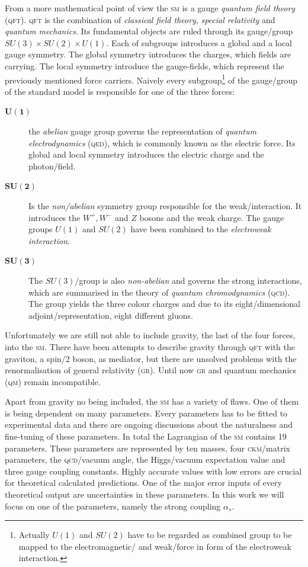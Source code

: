 \documentclass[../../index.tex]{subfiles}
\begin{document}
From a more mathematical point of view the \textsc{sm} is a gauge \textit{
  quantum field theory} (\textsc{qft}). \textsc{qft} is the combination of
\textit{classical field theory}, \textit{special relativity} and \textit{quantum
  mechanics}. Its fundamental objects are ruled through its gauge\-/group
$SU(3)\times SU(2)\times U(1)$. Each of subgroups introduces a global and a
local gauge symmetry. The global symmetry introduces the charges, which fields
are carrying. The local symmetry introduce the gauge-fields, which represent the
previously mentioned force carriers. Naively every subgroup\footnote{Actually
  $U(1)$ and $SU(2)$ have to be regarded as combined group to be mapped to the
  electromagnetic\-/ and weak\-/force in form of the electroweak interaction.}
of the gauge\-/group of the standard model is responsible for one of the three
forces:
\begin{description}
\item[$\bm{U(1)}$] the \textit{abelian} gauge group governs the representation
  of \textit{quantum electrodynamics} (\textsc{qed}), which is commonly known as
  the electric force. Its global and local symmetry introduces the electric
  charge and the photon\-/field.
\item[$\bm{SU(2)}$] Is the \textit{non\-/abelian} symmetry group responsible for
  the weak\-/interaction. It introduces the $W^+,W^-$ and $Z$ bosons and the
  weak charge. The gauge groups $U(1)$ and $SU(2)$ have been combined to the
  \textit{electroweak interaction}.
\item[$\bm{SU(3)}$] The $SU(3)$\-/group is also \textit{non-abelian} and governs
  the strong interactions, which are summarised in the theory of \textit{quantum
    chromodynamics} (\textsc{qcd}). The group yields the three colour charges
  and due to its eight\-/dimensional adjoint\-/representation, eight different
  gluons.
\end{description}
Unfortunately we are still not able to include gravity, the last of the four
forces, into the \textsc{sm}. There have been attempts to describe gravity
through \textsc{qft} with the graviton, a spin\-/2 boson, as mediator, but there
are unsolved problems with the renormalisation of general relativity
(\textsc{gr}). Until now \textsc{gr} and quantum mechanics (\textsc{qm}) remain
incompatible.

Apart from gravity no being included, the \textsc{sm} has a variety of flaws.
One of them is being dependent on many parameters. Every parameters has to be
fitted to experimental data and there are ongoing discussions about the
naturalness and fine-tuning of these parameters. In total the Lagrangian of the
\textsc{sm} contains 19 parameters. These parameters are represented by ten
masses, four \textsc{ckm}\-/matrix parameters, the \textsc{qcd}\-/vacuum angle,
the Higgs\-/vacuum expectation value and three gauge coupling constants. Highly
accurate values with low errors are crucial for theoretical calculated
predictions. One of the major error inputs of every theoretical output are
uncertainties in these parameters. In this work we will focus on one of the
parameters, namely the strong coupling $\alpha_s$.
\end{document}
